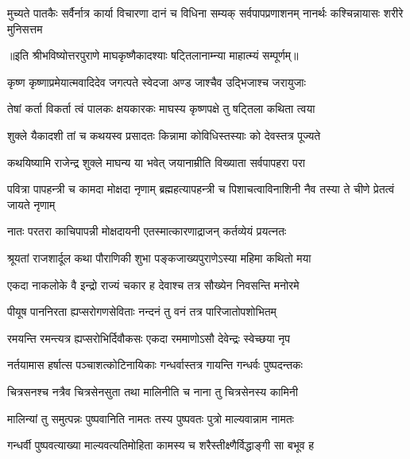 \threelineshloka
{मुच्यते पातकैः सर्वैर्नात्र कार्या विचारणा}
{दानं च विधिना सम्यक् सर्वपापप्रणाशनम्}
{नानर्थः कश्चिन्नायासः शरीरे मुनिसत्तम} %

॥इति श्रीभविष्योत्तरपुराणे माघकृष्णैकादश्याः षट्तिलानाम्न्या माहात्म्यं सम्पूर्णम्॥


\hyperref[sec:ekadashi_mahatmyam_vrata_raja]{\closesub}
\clearpage

\label{sec:vrata-raja-magha-shukla-jaya}


\twolineshloka
{कृष्ण कृष्णाप्रमेयात्मवादिदेव जगत्पते}
{स्वेदजा अण्ड जाश्चैव उद्भिजाश्च जरायुजाः} %

\twolineshloka
{तेषां कर्ता विकर्ता त्वं पालकः क्षयकारकः}
{माघस्य कृष्णपक्षे तु षट्तिला कथिता त्वया} %

\twolineshloka
{शुक्ले यैकादशी तां च कथयस्व प्रसादतः}
{किन्नामा कोविधिस्तस्याः को देवस्तत्र पूज्यते} %


\twolineshloka
{कथयिष्यामि राजेन्द्र शुक्ले माघन्य या भवेत्}
{जयानाम्रीति विख्याता सर्वपापहरा परा} %


\threelineshloka
{पवित्रा पापहन्त्री च कामदा मोक्षदा नृणाम्}
{ब्रह्महत्यापहन्त्री च पिशाचत्वाविनाशिनी}
{नैव तस्या ते चीणे प्रेतत्वं जायते नृणाम्} %

\twolineshloka
{नातः परतरा काचिपापन्नी मोक्षदायनी}
{एतस्मात्कारणाद्राजन् कर्तव्येयं प्रयत्नतः} %

\twolineshloka
{श्रूयतां राजशार्दूल कथा पौराणिकी शुभा}
{पङ्कजाख्यपुराणेऽस्या महिमा कथितो मया} %

\twolineshloka
{एकदा नाकलोके वै इन्द्रो राज्यं चकार ह}
{देवाश्च तत्र सौख्येन निवसन्ति मनोरमे} %

\twolineshloka
{पीयूष पाननिरता ह्यप्सरोगणसेविताः}
{नन्दनं तु वनं तत्र पारिजातोपशोभितम्} %

\twolineshloka
{रमयन्ति रमन्त्यत्र ह्यप्सरोभिर्दिवौकसः}
{एकदा रममाणोऽसौ देवेन्द्रः स्वेच्छया नृप} %

\twolineshloka
{नर्तयामास हर्षात्स पञ्चाशत्कोटिनायिकाः}
{गन्धर्वास्तत्र गायन्ति गन्धर्वः पुष्पदन्तकः} %

\twolineshloka
{चित्रसनश्च नत्रैव चित्रसेनसुता तथा}
{मालिनीति च नाना तु चित्रसेनस्य कामिनी} %

\twolineshloka
{मालिन्यां तु समुत्पन्नः पुष्पवानिति नामतः}
{तस्य पुष्पवतः पुत्रो माल्यवान्नाम नामतः} %

\twolineshloka
{गन्धर्वी पुष्पवत्याख्या माल्यवत्यतिमोहिता}
{कामस्य च शरैस्तीक्ष्णैर्विद्धाङ्गी सा बभूव ह} %

